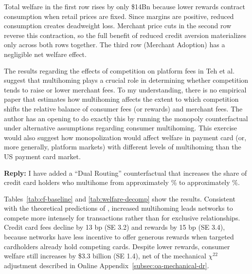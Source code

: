 \documentclass[main.tex]{subfiles}
\begin{document}
\begin{refsection}
Total welfare in the first row rises by only \$14Bn because lower rewards contract consumption when retail prices are fixed.
Since margins are positive, reduced consumption creates deadweight loss.
Merchant price cuts in the second row reverse this contraction, so the full benefit of reduced credit aversion materializes only across both rows together.
The third row (Merchant Adoption) has a negligible net welfare effect.

\begin{refcommentnoclear}
The results regarding the effects of competition on platform fees in Teh et al. suggest that multihoming plays a crucial role in determining whether competition tends to raise or lower merchant fees.
To my understanding, there is no empirical paper that estimates how multihoming affects the extent to which competition shifts the relative balance of consumer fees (or rewards) and merchant fees.
The author has an opening to do exactly this by running the monopoly counterfactual under alternative assumptions regarding consumer multihoming.
This exercise would also suggest how monopolization would affect welfare in payment card (or, more generally, platform markets) with different levels of multihoming than the US payment card market.

\end{refcommentnoclear}

\textbf{Reply:} I have added a ``Dual Routing'' counterfactual that increases the share of credit card holders who multihome from approximately \% to approximately \%.

Tables~\ref{tab:cf-baseline} and \ref{tab:welfare-decomp} show the results.
Consistent with the theoretical predictions of \textcite{Teh.etal2022}, increased multihoming leads networks to compete more intensely for transactions rather than for exclusive relationships.
Credit card fees decline by 13 bp (SE 3.2) and rewards by 15 bp (SE 3.4), because networks have less incentive to offer generous rewards when targeted cardholders already hold competing cards.
Despite lower rewards, consumer welfare still increases by \$3.3 billion (SE 1.4), net of the mechanical $\chi^{22}$ adjustment described in Online Appendix~\ref{subsec:oa-mechanical-dr}.


\end{refsection}
\end{document}
